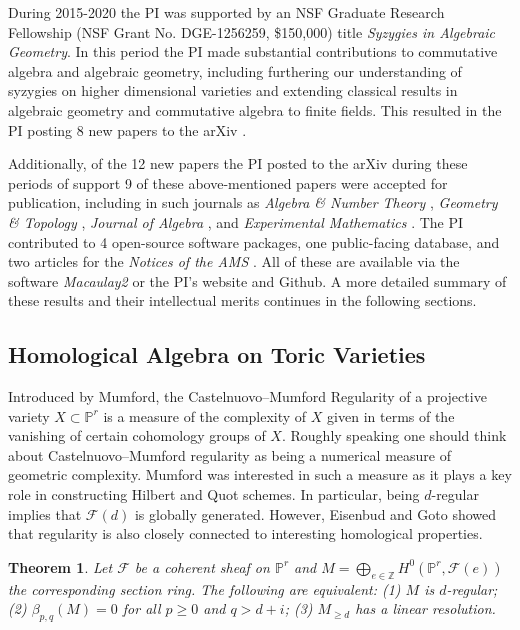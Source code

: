 \documentclass[11pt,reqno]{amsart}
\newtheorem{theorem}[lemma]{Theorem}
\theoremstyle{remark}
\newcommand{\PP}{\mathbb{P}}
\newcommand{\ZZ}{\mathbb{Z}}
\newcommand{\cF}{\mathcal{F}}
\begin{document}
During 2015-2020 the PI was supported by an NSF Graduate Research Fellowship (NSF Grant No. DGE-1256259, \$150,000) title \textit{Syzygies in Algebraic Geometry}. In this period the PI made substantial contributions to commutative algebra and algebraic geometry, including furthering our understanding of syzygies on higher dimensional varieties and extending classical results in algebraic geometry and commutative algebra to finite fields. This resulted in the PI posting 8 new papers to the arXiv \cite{ABLS20,BBBKR17,bruceErman19,bruceLi20,BEGY20,BEGY21,bruce24,bruce22}.

Additionally, of the 12 new papers the PI posted to the arXiv during these periods of support 9 of these above-mentioned papers were accepted for publication, including in such journals as \textit{Algebra \& Number Theory} \cite{bruceErman19}, \textit{Geometry \& Topology} \cite{BBCMMW24}, \textit{Journal of Algebra} \cite{BCEGLY22}, and \textit{Experimental Mathematics} \cite{BEGY20}. The PI contributed to 4 open-source software packages, one public-facing database, and two articles for the \textit{Notices of the AMS} \cite{BBB21,bruceNotices22}. All of these are available via the software \textit{Macaulay2} or the PI's website and Github. A more detailed summary of these results and their intellectual merits continues in the following sections. 

\subsection{Homological Algebra on Toric Varieties}\label{subsec:prior:homological-algebra-on-toric}


Introduced by Mumford, the Castelnuovo–Mumford Regularity of a projective variety $X\subset \PP^{r}$ is a measure of the complexity of $X$ given in terms of the vanishing of certain cohomology groups of $X$. Roughly speaking one should think about Castelnuovo--Mumford regularity as being a numerical measure of geometric complexity. Mumford was interested in such a measure as it plays a key role in constructing Hilbert and Quot schemes. In particular, being $d$-regular implies that $\cF(d)$ is globally generated. However, Eisenbud and Goto showed that regularity is also closely connected to interesting homological properties.

\begin{theorem}\cite{eisenbudGoto84}\label{thm:eisenbud-goto}
Let $\cF$ be a coherent sheaf on $\PP^{r}$ and $M=\bigoplus_{e\in\ZZ} H^0(\PP^{r},\cF(e))$ the corresponding section ring. The following are equivalent: (1) $M$ is $d$-regular; (2) $\beta_{p,q}(M)=0$ for all $p\geq0$ and $q>d+i$; (3) $M_{\geq d}$ has a linear resolution. 
\end{theorem}
\end{document}
